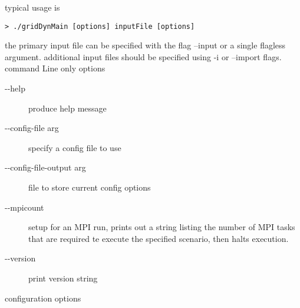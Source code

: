 \documentclass[12pt]{article} %
\begin{document}
typical usage is
\begin{verbatim}
> ./gridDynMain [options] inputFile [options]
\end{verbatim}
the primary input file can be specified with the flag --input or a single flagless argument.  additional input files should be specified using -i or --import flags.
command Line only options
\begin{description}

    \item [-{}-help]                  produce help message
    \item [-{}-config-file arg]        specify a config file to use
    \item [-{}-config-file-output arg] file to store current config options
    \item [-{}-mpicount ]              setup for an MPI run, prints out a string listing the number of MPI tasks that are required te execute the specified scenario,  then halts execution.
    \item [-{}-version]                print version string
    \end{description}
    configuration options
\end{document}
